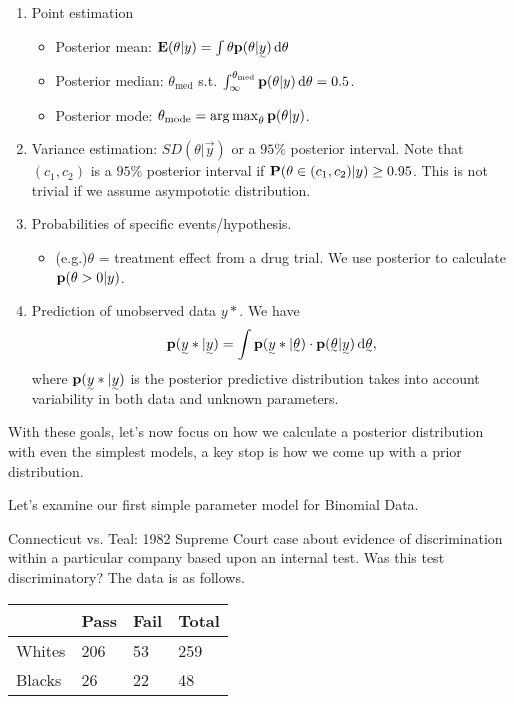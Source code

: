 \begin{enumerate}
    \item Point estimation
    \begin{itemize}
        \item Posterior mean: $\E(\theta| y) = \int \theta \p(\theta| \vec{y}) \diff \theta$
        \item Posterior median: $\theta_{\text{med}}$ s.t. $\int_{\infty}^{\theta_{\text{med}}} \p(\theta| y) \diff \theta = 0.5$.
        \item Posterior mode: $\theta_{\text{mode}} = \argmax_{\theta} \p(\theta| y)$.
    \end{itemize}
    \item Variance estimation: $SD(\theta| \vec{y})$ or a $95\%$ posterior interval. Note that $(c_1, c_2)$ is a $95\%$ posterior interval if $\P(\theta \in (c_1, c_2) | y) \ge 0.95$. This is not trivial if we assume asympototic distribution.
    \item Probabilities of specific events/hypothesis.
    \begin{itemize}
        \item (e.g.)$\theta$ = treatment effect from a drug trial. We use posterior to calculate $\p(\theta>0|y)$.
    \end{itemize}
    \item Prediction of unobserved data $y*$. We have
    \[
        \p(\vec{y}*| \vec{y}) = \int \p(\vec{y}*| \vec{\theta}) \cdot \p(\vec{\theta}| \vec{y}) \diff \vec{\theta},
    \]
    where $\p(\vec{y}*| \vec{y})$ is the posterior predictive distribution takes into account variability in both data and unknown parameters.
\end{enumerate}

With these goals, let's now focus on how we calculate a posterior distribution with even the simplest models, a key stop is how we come up with a prior distribution.

Let's examine our first simple parameter model for Binomial Data.

Connecticut vs. Teal: 1982 Supreme Court case about evidence of discrimination within a particular company based upon an internal test. Was this test discriminatory? The data is as follows.

\begin{table}[ht]
\centering
\begin{tabular}{@{}llll@{}}
\toprule
       & Pass & Fail & Total \\ \midrule
Whites & 206  & 53   & 259   \\
Blacks & 26   & 22   & 48    \\ \bottomrule
\end{tabular}
\end{table}

